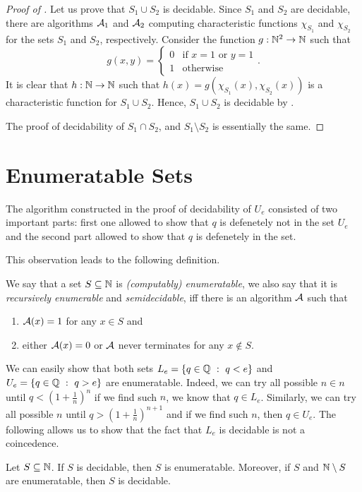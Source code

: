 \begin{proof}[Proof of ]
  Let us prove that $S_1 \cup S_2$ is decidable. Since $S_1$ and $S_2$ are
  decidable, there are algorithms $\mathcal{A}_1$ and $\mathcal{A}_2$
  computing characteristic functions $\chi_{S_1}$ and $\chi_{S_2}$
  for the sets $S_1$ and $S_2$, respectively.
  Consider the function $g : \mathbb{N}^2 \to \mathbb{N}$ such that
  \[
    g(x, y) = \begin{cases}
      0 & \text{if } x = 1 \text{ or } y = 1 \\
      1 & \text{otherwise}
    \end{cases}.
  \]
  It is clear that $h : \mathbb{N} \to \mathbb{N}$ such that
  $h(x) = g(\chi_{S_1}(x), \chi_{S_2}(x))$ is a characteristic function for
  $S_1 \cup S_2$. Hence, $S_1 \cup S_2$ is decidable by
  .

  The proof of decidability of $S_1 \cap S_2$, and $S_1 \setminus S_2$
  is essentially the same.
\end{proof}

\section{Enumeratable Sets}
The algorithm constructed in the proof of decidability of $U_e$ consisted of
two important parts: first one allowed to show that $q$ is defenetely not in the
set $U_e$ and the second part allowed to show that $q$ is defenetely in the set.

This observation leads to the following definition.
\begin{definition}
  We say that a set $S \subseteq \mathbb{N}$ is \emph{(computably) enumeratable},
  we also say that it is \emph{recursively enumerable} and \emph{semidecidable},
  iff there is an algorithm $\mathcal{A}$ such that
  \begin{enumerate}
    \item $\mathcal{A}(x) = 1$ for any $x \in S$ and
    \item either $\mathcal{A}(x) = 0$ or $\mathcal{A}$ never terminates for
      any $x \notin S$.
  \end{enumerate}
\end{definition}

We can easily show that both sets $L_e = \set[q < e]{q \in \Q}$ and
$U_e = \set[q > e]{q \in \Q}$ are enumeratable. Indeed, we can try all possible
$n \in n$ until $q < (1 + \frac{1}{n})^n$ if we find such $n$, we know that
$q \in L_e$. Similarly, we can try all possible $n$ until
$q > (1 + \frac{1}{n})^{n + 1}$ and if we find such $n$, then $q \in U_e$.
The following allows us to show that the fact that $L_e$ is decidable is not
a coincedence.
\begin{theorem}
  Let $S \subseteq \mathbb{N}$. If $S$ is decidable, then $S$ is enumeratable.
  Moreover, if $S$ and $\mathbb{N} \setminus S$ are enumeratable, then $S$ is
  decidable.
\end{theorem}

